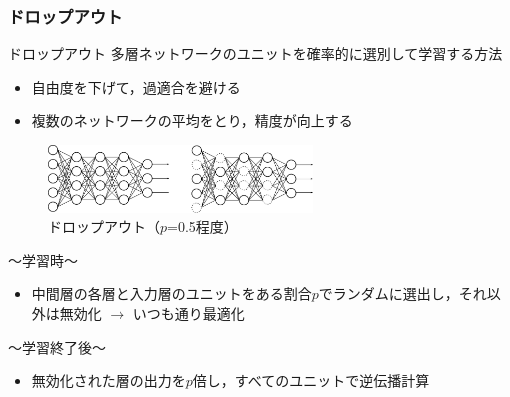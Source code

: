 \documentclass[dvipdfmx,11pt,notheorems]{beamer}
\theoremstyle{definition}
\begin{document}
\begin{frame}\frametitle{ドロップアウト}
 \begin{block}{ドロップアウト}
  多層ネットワークのユニットを確率的に選別して学習する方法
 \end{block}
 \begin{itemize}
  \item 自由度を下げて，過適合を避ける
  \item 複数のネットワークの平均をとり，精度が向上する
 \end{itemize}
\begin{figure}[tb]
  \begin{center}
    \includegraphics[clip,width=7cm]{./fig/eps/dropout1.eps}
  \end{center}
  \caption{ドロップアウト（$p$=0.5程度）}
  \label{fig: ドロップアウト（p=0.5程度）}
\end{figure}
\vspace{-0.5cm}
 〜学習時〜
 \begin{itemize}
  \item 中間層の各層と入力層のユニットをある割合$p$でランダムに選出し，それ以外は無効化 $\rightarrow$ いつも通り最適化
 \end{itemize}
 〜学習終了後〜
 \begin{itemize}
  \item 無効化された層の出力を$p$倍し，すべてのユニットで逆伝播計算
 \end{itemize}
\end{frame}
\end{document}
